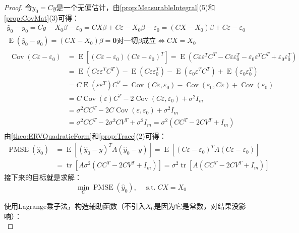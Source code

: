 \begin{proof}
	令$\hat{y}_0=Cy$是一个无偏估计，由\cref{prop:MeasurableIntegral}(5)和\cref{prop:CovMat}(3)可得：
	\begin{gather*}
		\hat{y}_0-y_0=Cy-X_0\beta-\varepsilon_0=CX\beta+C\varepsilon-X_0\beta-\varepsilon_0=(CX-X_0)\beta+C\varepsilon-\varepsilon_0 \\
		\operatorname{E}(\hat{y}_0-y_0)=(CX-X_0)\beta=\mathbf{0}\text{对一切$\beta$成立}\iff CX=X_0 \\
		\begin{aligned}
			\operatorname{Cov}(C\varepsilon-\varepsilon_0)&=\operatorname{E}[(C\varepsilon-\varepsilon_0)(C\varepsilon-\varepsilon_0)^T]=\operatorname{E}(C\varepsilon\varepsilon^TC^T-C\varepsilon\varepsilon_0^T-\varepsilon_0\varepsilon^TC^T+\varepsilon_0\varepsilon_0^T) \\
			&=\operatorname{E}(C\varepsilon\varepsilon^TC^T)-\operatorname{E}(C\varepsilon\varepsilon_0^T)-\operatorname{E}(\varepsilon_0\varepsilon^TC^T)+\operatorname{E}(\varepsilon_0\varepsilon_0^T) \\
			&=C\operatorname{E}(\varepsilon\varepsilon^T)C^T-\operatorname{Cov}(C\varepsilon,\varepsilon_0)-\operatorname{Cov}(\varepsilon_0,C\varepsilon)+\operatorname{Cov}(\varepsilon_0) \\
			&=C\operatorname{Cov}(\varepsilon)C^T-2\operatorname{Cov}(C\varepsilon,\varepsilon_0)+\sigma^2I_m \\
			&=\sigma^2CC^T-2C\operatorname{Cov}(\varepsilon,\varepsilon_0)+\sigma^2I_m \\
			&=\sigma^2CC^T-2\sigma^2CV^T+\sigma^2I_m=\sigma^2(CC^T-2CV^T+I_m)
		\end{aligned}
	\end{gather*}
	由\cref{theo:ERVQuadraticForm}和\cref{prop:Trace}(2)可得：
	\begin{align*}
		\operatorname{PMSE}(\hat{y}_0)&=\operatorname{E}[(\hat{y}_0-y)^TA(\hat{y}_0-y)] =\operatorname{E}[(C\varepsilon-\varepsilon_0)^TA(C\varepsilon-\varepsilon_0)] \\
		&=\operatorname{tr}[A\sigma^2(CC^T-2CV^T+I_m)] =\sigma^2\operatorname{tr}[A(CC^T-2CV^T+I_m)]
	\end{align*}
	接下来的目标就是求解：
	\begin{equation*}
		\min_{C}\operatorname{PMSE}(\hat{y}_0),\quad\operatorname{s.t.}CX=X_0
	\end{equation*}\par
	使用Lagrange乘子法，构造辅助函数（不引入$X_0$是因为它是常数，对结果没影响）：
	\begin{equation*}

\end{equation*}
\end{proof}
